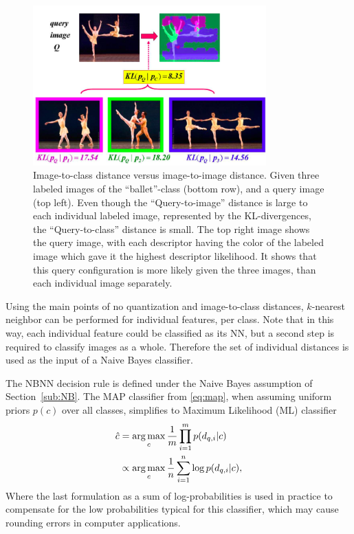 \begin{figure}[hbt]
    \centering
    \includegraphics[width=0.8\textwidth]{Im2imVsIm2cl}
    \caption{Image-to-class distance versus image-to-image distance. Given three labeled images of the ``ballet''-class (bottom row), and a query image (top left). Even though the ``Query-to-image'' distance is large to each individual labeled image, represented by the KL-divergences, the ``Query-to-class'' distance is small. The top right image shows the query image, with each descriptor having the color of the labeled image which gave it the highest descriptor likelihood. It shows that this query configuration is more likely given the three images, than each individual image separately. \cite{boiman2008defense, irani2006similarity}}
    \label{fig:im2im_vs_im2cl}
\end{figure}

Using the main points of no quantization and image-to-class distances, $k$-nearest neighbor can be performed for individual features, per class. Note that in this way, each individual feature could be classified as its NN, but a second step is required to classify images as a whole. Therefore the set of individual distances is used as the input of a Naive Bayes classifier.

The NBNN decision rule is defined under the Naive Bayes assumption of Section~\ref{sub:NB}. The MAP classifier from \eqref{eq:map}, when assuming uniform priors $p(c)$ over all classes, simplifies to Maximum Likelihood (ML) classifier 
\begin{align}
    \hat c &= \operatorname*{arg\,max}_c \frac{1}{m}\prod_{i=1}^{m} p(d_{q,i}|c)\\
           &\propto \operatorname*{arg\,max}_c \frac{1}{n}\sum_{i=1}^{n} \log p(d_{q,i}|c),
\end{align}
Where the last formulation as a sum of log-probabilities is used in practice to compensate for the low probabilities typical for this classifier, which may cause rounding errors in computer applications.

